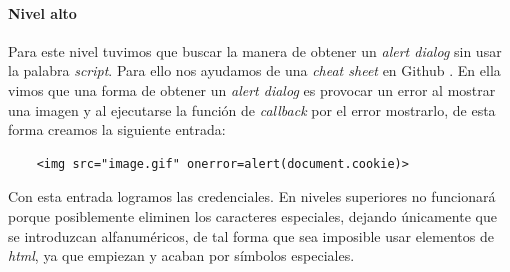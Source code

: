 \paragraph{Nivel alto} Para este nivel tuvimos que buscar la manera de obtener un {\it alert dialog} sin usar la 
palabra {\it script}. Para ello nos ayudamos de una {\it cheat sheet} en Github \cite{xsscheatsheet}. En ella vimos
que una forma de obtener un {\it alert dialog} es provocar un error al mostrar una imagen y al ejecutarse la función
de {\it callback} por el error mostrarlo, de esta forma creamos la siguiente entrada:
\begin{lstlisting}
    <img src="image.gif" onerror=alert(document.cookie)>
\end{lstlisting}
Con esta entrada logramos las credenciales. En niveles superiores no funcionará porque 
posiblemente eliminen los caracteres especiales, dejando únicamente que se introduzcan alfanuméricos, de tal forma 
que sea imposible usar elementos de {\it html}, ya que empiezan y acaban por símbolos especiales.

